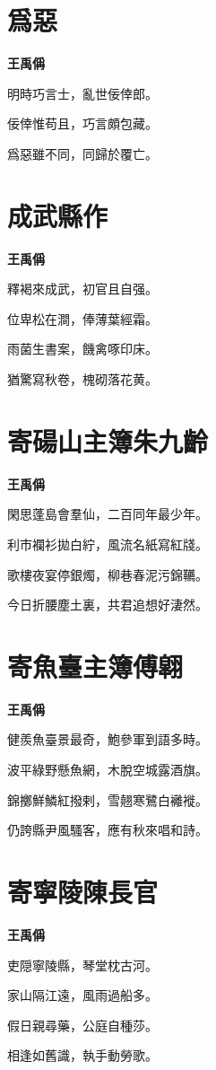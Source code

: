 \documentclass[12pt,a4paper]{ctexbook}
\begin{document}
\section{爲惡}
\textbf{王禹偁}\par\vspace{0.5em}
明時巧言士，亂世佞倖郎。\par
佞倖惟苟且，巧言頗包藏。\par
爲惡雖不同，同歸於覆亡。\par

\section{成武縣作}
\textbf{王禹偁}\par\vspace{0.5em}
釋褐來成武，初官且自强。\par
位卑松在澗，俸薄葉經霜。\par
雨菌生書案，饑禽啄印床。\par
猶驚寫秋卷，槐砌落花黄。\par

\section{寄碭山主簿朱九齡}
\textbf{王禹偁}\par\vspace{0.5em}
閑思蓬島會羣仙，二百同年最少年。\par
利市襴衫拋白紵，風流名紙寫紅牋。\par
歌樓夜宴停銀燭，柳巷春泥污錦韉。\par
今日折腰塵土裏，共君追想好淒然。\par

\section{寄魚臺主簿傅翶}
\textbf{王禹偁}\par\vspace{0.5em}
健羨魚臺景最奇，鮑參軍到語多時。\par
波平綠野懸魚網，木脫空城露酒旗。\par
錦擲鮮鱗紅撥剌，雪翹寒鷺白䙰褷。\par
仍誇縣尹風騷客，應有秋來唱和詩。\par

\section{寄寧陵陳長官}
\textbf{王禹偁}\par\vspace{0.5em}
吏隠寧陵縣，琴堂枕古河。\par
家山隔江遠，風雨過船多。\par
假日親尋藥，公庭自種莎。\par
相逢如舊識，執手動勞歌。\par
\end{document}
